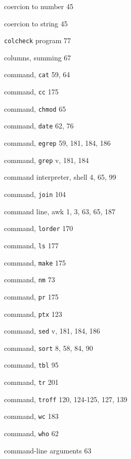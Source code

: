 \begin{multicols}{3}
\hangindent=4pc  coercion to number 45

\hangindent=4pc  coercion to string 45

\hangindent=4pc  \verb'colcheck' program 77

\hangindent=4pc  columns, summing 67

\hangindent=4pc  command, \verb'cat' 59, 64

\hangindent=4pc  command, \verb'cc' 175

\hangindent=4pc  command, \verb'chmod' 65

\hangindent=4pc  command, \verb'date' 62, 76

\hangindent=4pc  command, \verb'egrep' 59, 181, 184, 186

\hangindent=4pc  command, \verb'grep' v, 181, 184

\hangindent=4pc  command interpreter, shell 4, 65, 99

\hangindent=4pc  command, \verb'join' 104

\hangindent=4pc  command line, awk 1, 3, 63, 65, 187

\hangindent=4pc  command, \verb'lorder' 170

\hangindent=4pc  command, \verb'ls' 177

\hangindent=4pc  command, \verb'make' 175

\hangindent=4pc  command, \verb'nm' 73

\hangindent=4pc  command, \verb'pr' 175

\hangindent=4pc  command, \verb'ptx' 123

\hangindent=4pc  command, \verb'sed' v, 181, 184, 186

\hangindent=4pc  command, \verb'sort' 8, 58, 84, 90

\hangindent=4pc  command, \verb'tbl' 95

\hangindent=4pc  command, \verb'tr' 201

\hangindent=4pc  command, \verb'troff' 120, 124-125, 127, 139

\hangindent=4pc  command, \verb'wc' 183

\hangindent=4pc  command, \verb'who' 62

\hangindent=4pc  command-line arguments 63


\end{multicols}
